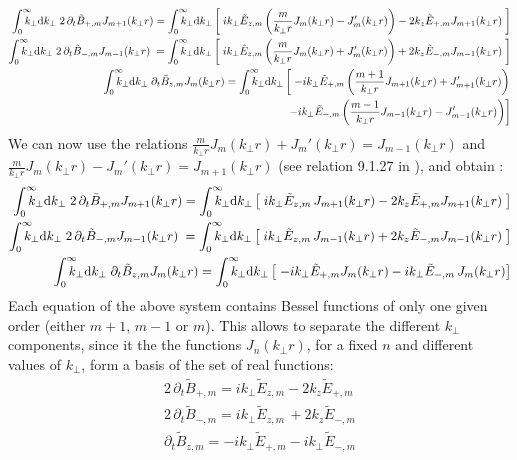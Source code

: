 \begin{align*}
\RInteg{k_\perp } \; 2 \,\partial_t \tilde{B}_{+,m}  J_{m+1}(k_\perp r) =
\RInteg{k_\perp } \left[ \; ik_\perp \tilde{E}_{z,m} \left( \frac{m}{k_\perp r} J_m(k_\perp r) -
    J_m'(k_\perp r) \right) -2 k_z\tilde{E}_{+,m}J_{m+1}(k_\perp r) \;
\right] \\
\RInteg{k_\perp } \; 2\, \partial_t \tilde{B}_{-,m}  J_{m-1}(k_\perp r) \; =
\RInteg{k_\perp } \left[ \;
   ik_\perp \tilde{E}_{z,m} \left( \frac{m}{k_\perp r} J_m(k_\perp r) +
    J_m'(k_\perp r) \right)  + 2k_z\tilde{E}_{-,m}J_{m-1}(k_\perp r) \;
\right] \\
\RInteg{k_\perp }\; \partial_t \tilde{B}_{z,m}  J_{m}(k_\perp r) =
\RInteg{k_\perp } \left[ \; -ik_\perp \tilde{E}_{+,m}\left(\frac{m+1}{k_\perp r}J_{m+1}(k_\perp r) +
    J_{m+1}'(k_\perp r) \right) \right.\\
\qquad \left. - ik_\perp \tilde{E}_{-,m}\left(\frac{m-1}{k_\perp r}J_{m-1}(k_\perp r) -
    J_{m-1}'(k_\perp r) \right) \right] 
\end{align*}
We can now use the relations $\frac{m}{k_\perp r} J_m(k_\perp r) +
    J_m'(k_\perp r) = J_{m-1}(k_\perp r)$ and $\frac{m}{k_\perp r} J_m(k_\perp r) -
    J_m'(k_\perp r) = J_{m+1}(k_\perp r)$ (see relation 9.1.27 in
    \cite{Abramowitz}), and obtain :
\begin{align*}
\RInteg{k_\perp } \; 2 \,\partial_t \tilde{B}_{+,m}  J_{m+1}(k_\perp r) =
\RInteg{k_\perp } \left[ \; ik_\perp \tilde{E}_{z,m}\,
    J_{m+1}(k_\perp r) -2 k_z\tilde{E}_{+,m}J_{m+1}(k_\perp r) \;
\right] \\
\RInteg{k_\perp } \; 2\, \partial_t \tilde{B}_{-,m}  J_{m-1}(k_\perp r) \; =
\RInteg{k_\perp } \left[ \;
   ik_\perp \tilde{E}_{z,m} \,
    J_{m-1}(k_\perp r) + 2k_z\tilde{E}_{-,m}J_{m-1}(k_\perp r) \;
\right] \\
\RInteg{k_\perp }\; \partial_t \tilde{B}_{z,m}  J_{m}(k_\perp r) =
\RInteg{k_\perp } \left[ \; -ik_\perp \tilde{E}_{+,m} J_{m}(k_\perp r) - ik_\perp \tilde{E}_{-,m}\,J_{m}(k_\perp r) \right] 
\end{align*}
Each equation of the above system contains Bessel functions of only one
given order (either $m+1$, $m-1$ or $m$). This allows to separate the
different $k_\perp $ components, since it the the functions $J_n(k_\perp r)$, for a
fixed $n$ and different values of $k_\perp $, form a basis of the set of real functions:
\begin{align*}
2 \,\partial_t \tilde{B}_{+,m} =
ik_\perp \tilde{E}_{z,m} -2 k_z\tilde{E}_{+,m} \\
2\, \partial_t \tilde{B}_{-,m} = ik_\perp \tilde{E}_{z,m} \,
    + 2k_z\tilde{E}_{-,m} \\
 \partial_t \tilde{B}_{z,m} = -ik_\perp \tilde{E}_{+,m}  - ik_\perp \tilde{E}_{-,m}
\end{align*}

